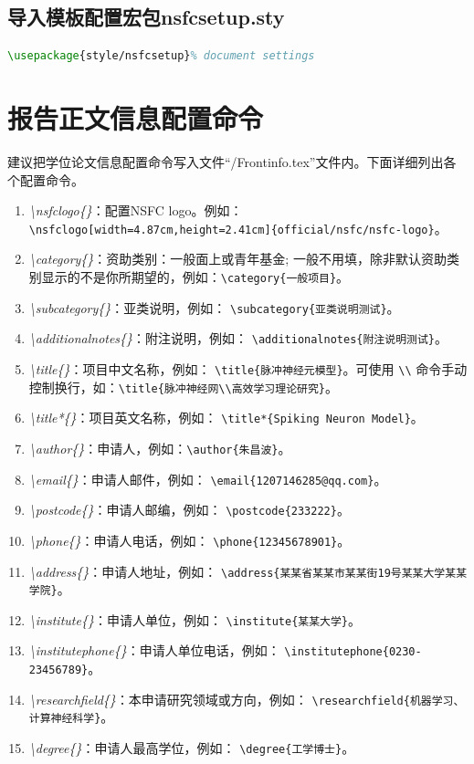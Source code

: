 \subsection{导入模板配置宏包nsfcsetup.sty}
\begin{lstlisting}[language=tex]
        \usepackage{style/nsfcsetup}% document settings
 \end{lstlisting}%



 
 \section{\projectname 报告正文信息配置命令}
 建议把学位论文信息配置命令写入文件“\projectname /Frontinfo.tex”文件内。下面详细列出各个配置命令。
 \begin{enumerate}
    \item \emph{\backslash nsfclogo\{\}}：配置NSFC logo。例如：\newline \verb|\nsfclogo[width=4.87cm,height=2.41cm]{official/nsfc/nsfc-logo}|。
    \item \emph{\backslash category\{\}}：资助类别：一般面上或青年基金; 一般不用填，除非默认资助类别显示的不是你所期望的，例如：\verb|\category{一般项目}|。
    \item \emph{\backslash subcategory\{\}}：亚类说明，例如： \verb|\subcategory{亚类说明测试}|。
    \item \emph{\backslash additionalnotes\{\}}：附注说明，例如： \verb|\additionalnotes{附注说明测试}|。
    \item \emph{\backslash title\{\}}：项目中文名称，例如： \verb|\title{脉冲神经元模型}|。可使用 \verb|\\| 命令手动控制换行，如：\verb|\title{脉冲神经网\\高效学习理论研究}|。
    \item \emph{\backslash title*\{\}}：项目英文名称，例如： \verb|\title*{Spiking Neuron Model}|。
    \item \emph{\backslash author\{\}}：申请人，例如：\verb|\author{朱昌波}|。
    \item \emph{\backslash email\{\}}：申请人邮件，例如： \verb|\email{1207146285@qq.com}|。
    \item \emph{\backslash postcode\{\}}：申请人邮编，例如： \verb|\postcode{233222}|。
    \item \emph{\backslash phone\{\}}：申请人电话，例如： \verb|\phone{12345678901}|。
    \item \emph{\backslash address\{\}}：申请人地址，例如： \verb|\address{某某省某某市某某街19号某某大学某某学院}|。
    \item \emph{\backslash institute\{\}}：申请人单位，例如： \verb|\institute{某某大学}|。
    \item \emph{\backslash institutephone\{\}}：申请人单位电话，例如： \verb|\institutephone{0230-23456789}|。
    \item \emph{\backslash researchfield\{\}}：本申请研究领域或方向，例如： \verb|\researchfield{机器学习、计算神经科学}|。
    \item \emph{\backslash degree\{\}}：申请人最高学位，例如： \verb|\degree{工学博士}|。
\end{enumerate}
